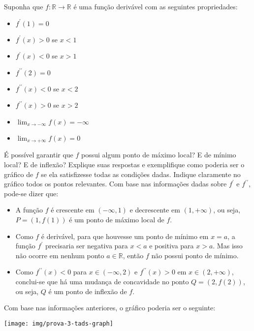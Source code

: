 \documentclass[12pt,a4paper]{article}
\newcommand*\R{\mathbb{R}}
\begin{document}
\begin{ExerciseList}
\Exercise[title={2,0}] Suponha que $f:\R \to \R$ é uma função derivável com as seguintes propriedades:
\begin{multicols}{3}
\begin{itemize}
\item $f^\prime(1) = 0$
\item $f^\prime(x) > 0$ se $x < 1$
\item $f^\prime(x) < 0$ se $x > 1$
\item $f^{\prime\prime}(2) = 0$
\item $f^{\prime\prime}(x) < 0$ se $x < 2$
\item $f^{\prime\prime}(x) > 0$ se $x > 2$
\item $\displaystyle\lim_{x \to -\infty} f(x) = -\infty$
\item $\displaystyle\lim_{x \to +\infty} f(x) = 0$
\end{itemize}
\end{multicols}
É possível garantir que $f$ possui algum ponto de máximo local? E de mínimo local? E de inflexão? Explique suas respostas e exemplifique como poderia ser o gráfico de $f$ se ela satisfizesse todas as condições dadas. Indique claramente no gráfico todos os pontos relevantes.
\Answer Com base nas informações dadas sobre $f^\prime$ e $f^{\prime\prime}$, pode-se dizer que:
\begin{itemize}
\item A função $f$ é crescente em $(-\infty, 1)$ e decrescente em $(1, +\infty)$, ou seja, $P = (1, f(1))$ é um ponto de máximo local de $f$.
\item Como $f$ é derivável, para que houvesse um ponto de mínimo em $x = a$, a função $f^\prime$ precisaria ser negativa para $x < a$ e positiva para $x>a$. Mas isso não ocorre em nenhum ponto $a \in \R$, então $f$ não possui ponto de mínimo.
\item Como $f^{\prime\prime}(x) < 0$ para $x \in (-\infty, 2)$ e $f^{\prime\prime} (x)> 0$ em $x \in (2, +\infty)$, conclui-se que há uma mudança de concavidade no ponto $Q = (2, f(2))$, ou seja, $Q$ é um ponto de inflexão de $f$.
\end{itemize}
Com base nas informações anteriores, o gráfico poderia ser o seguinte:
\begin{center}
\texttt{[image: img/prova-3-tads-graph]}
\end{center}


\end{ExerciseList}
\end{document}
